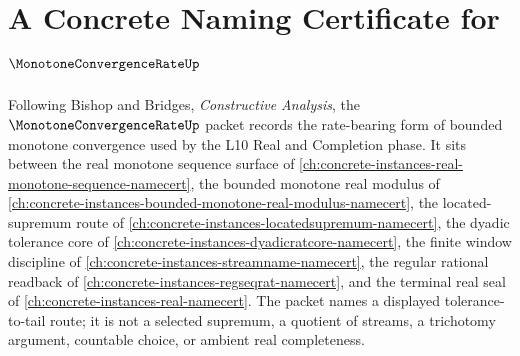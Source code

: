 \chapter{A Concrete Naming Certificate for $\MonotoneConvergenceRateUp$}
\label{ch:concrete-instances-monotone-convergence-rate-namecert}

Following Bishop and Bridges, \emph{Constructive Analysis}, the $\MonotoneConvergenceRateUp$ packet records the rate-bearing form of bounded monotone convergence used by the L10 Real and Completion phase. It sits between the real monotone sequence surface of \autoref{ch:concrete-instances-real-monotone-sequence-namecert}, the bounded monotone real modulus of \autoref{ch:concrete-instances-bounded-monotone-real-modulus-namecert}, the located-supremum route of \autoref{ch:concrete-instances-locatedsupremum-namecert}, the dyadic tolerance core of \autoref{ch:concrete-instances-dyadicratcore-namecert}, the finite window discipline of \autoref{ch:concrete-instances-streamname-namecert}, the regular rational readback of \autoref{ch:concrete-instances-regseqrat-namecert}, and the terminal real seal of \autoref{ch:concrete-instances-real-namecert}. The packet names a displayed tolerance-to-tail route; it is not a selected supremum, a quotient of streams, a trichotomy argument, countable choice, or ambient real completeness.

